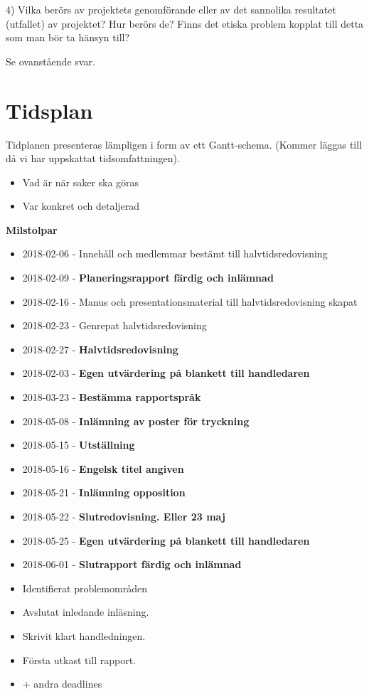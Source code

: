 \documentclass[12pt,a4paper]{article}
\begin{document}
4)  Vilka berörs av projektets genomförande eller av det sannolika resultatet (utfallet) av projektet? Hur berörs de? Finns det etiska problem kopplat till detta som man bör ta hänsyn till?

Se ovanstående svar.

\section{Tidsplan}

Tidplanen presenteras lämpligen i form av ett Gantt-schema.
(Kommer läggas till då vi har uppskattat tidsomfattningen).

\begin{itemize}
    \item Vad är när saker ska göras
    \item Var konkret och detaljerad
\end{itemize}

\textbf{Milstolpar}

\begin{itemize}
    \item 2018-02-06 - Innehåll och medlemmar bestämt till halvtidsredovisning
    \item 2018-02-09 - \textbf{Planeringsrapport färdig och inlämnad}
    \item 2018-02-16 - Manus och presentationsmaterial till halvtidsredovisning skapat
    \item 2018-02-23 - Genrepat halvtidsredovisning
    \item 2018-02-27 - \textbf{Halvtidsredovisning}
    \item 2018-02-03 - \textbf{Egen utvärdering på blankett till handledaren}
    \item 2018-03-23 - \textbf{Bestämma rapportspråk}
    \item 2018-05-08 - \textbf{Inlämning av poster för tryckning}
    \item 2018-05-15 - \textbf{Utställning}
    \item 2018-05-16 - \textbf{Engelsk titel angiven}
    \item 2018-05-21 - \textbf{Inlämning opposition}
    \item 2018-05-22 - \textbf{Slutredovisning. Eller 23 maj}
    \item 2018-05-25 - \textbf{Egen utvärdering på blankett till handledaren}
    \item 2018-06-01 - \textbf{Slutrapport färdig och inlämnad}
    \item Identifierat problemområden
    \item Avslutat inledande inläsning.
    \item Skrivit klart handledningen.
    \item Första utkast till rapport.
    \item + andra deadlines
\end{itemize}
\end{document}

